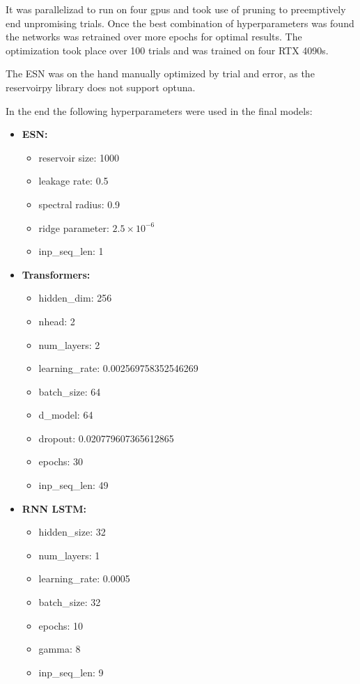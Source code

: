 \documentclass[11pt]{article}
\begin{document}
It was parallelizad to run on four gpus and took use of pruning to preemptively end unpromising trials. Once the best combination of hyperparameters was found the networks was retrained over more epochs for optimal results. The optimization took place over 100 trials and was trained on four RTX 4090s.

The ESN was on the hand manually optimized by trial and error, as the reservoirpy library does not support optuna.

In the end the following hyperparameters were used in the final models:

\begin{itemize}
    \item \textbf{ESN:}
    \begin{itemize}
        \item reservoir size: 1000
        \item leakage rate: 0.5
        \item spectral radius: 0.9
        \item ridge parameter: $2.5 \times 10^{-6}$
        \item inp\_seq\_len: 1
    \end{itemize}
    \item \textbf{Transformers:}
    \begin{itemize}
        \item hidden\_dim: 256
        \item nhead: 2
        \item num\_layers: 2
        \item learning\_rate: 0.002569758352546269
        \item batch\_size: 64
        \item d\_model: 64
        \item dropout: 0.020779607365612865
        \item epochs: 30
        \item inp\_seq\_len: 49
    \end{itemize}
    \item \textbf{RNN LSTM:}
    \begin{itemize}
        \item hidden\_size: 32
        \item num\_layers: 1
        \item learning\_rate: 0.0005
        \item batch\_size: 32
        \item epochs: 10
        \item gamma: 8
        \item inp\_seq\_len: 9
    \end{itemize}
\end{itemize}
\end{document}
